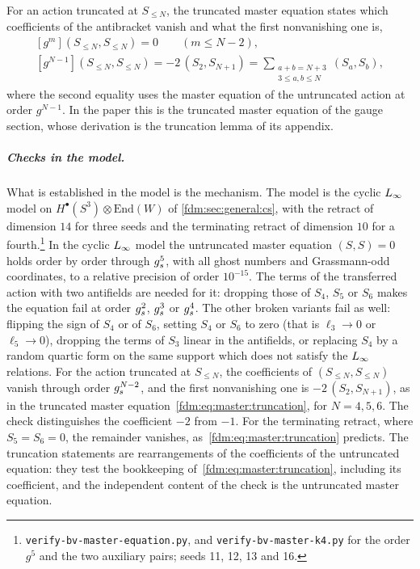 For an action truncated at $S_{\le N}$, the truncated master equation states which coefficients of the antibracket vanish and what the first nonvanishing one is,
\begin{subequations}
  \label{fdm:eq:master:truncation}
  \begin{gather}
    [g^m] (S_{\le N}, S_{\le N})
      = 0
    \qquad
    (m \le N - 2),
    \\
    [g^{N - 1}] (S_{\le N}, S_{\le N})
      = - 2 \, (S_2, S_{N + 1})
      = \sum_{\substack{a + b = N + 3 \\ 3 \le a, b \le N}} (S_a, S_b),
  \end{gather}
\end{subequations}
where the second equality uses the master equation of the untruncated action at order $g^{N - 1}$.
In the paper this is the truncated master equation of the gauge section, whose derivation is the truncation lemma of its appendix.

\subparagraph{Checks in the model.}
What is established in the model is the mechanism.
The model is the cyclic $L_\infty$ model on $H^\bullet(S^3) \otimes \mathrm{End}(W)$ of \cref{fdm:sec:general:cs}, with the retract of dimension $14$ for three seeds and the terminating retract of dimension $10$ for a fourth.\footnote{\texttt{verify-bv-master-equation.py}, and \texttt{verify-bv-master-k4.py} for the order $g^5$ and the two auxiliary pairs; seeds 11, 12, 13 and 16.}
In the cyclic $L_\infty$ model the untruncated master equation $(S, S) = 0$ holds order by order through $g_s^5$, with all ghost numbers and Grassmann-odd coordinates, to a relative precision of order $10^{-15}$.
The terms of the transferred action with two antifields are needed for it: dropping those of $S_4$, $S_5$ or $S_6$ makes the equation fail at order $g_s^2$, $g_s^3$ or $g_s^4$.
The other broken variants fail as well: flipping the sign of $S_4$ or of $S_6$, setting $S_4$ or $S_6$ to zero (that is $\ell_3 \to 0$ or $\ell_5 \to 0$), dropping the terms of $S_3$ linear in the antifields, or replacing $S_4$ by a random quartic form on the same support which does not satisfy the $L_\infty$ relations.
For the action truncated at $S_{\le N}$, the coefficients of $(S_{\le N}, S_{\le N})$ vanish through order $g_s^{N-2}$, and the first nonvanishing one is $- 2 \, (S_2, S_{N+1})$, as in the truncated master equation~\eqref{fdm:eq:master:truncation}, for $N = 4, 5, 6$.
The check distinguishes the coefficient $-2$ from $-1$.
For the terminating retract, where $S_5 = S_6 = 0$, the remainder vanishes, as~\eqref{fdm:eq:master:truncation} predicts.
The truncation statements are rearrangements of the coefficients of the untruncated equation: they test the bookkeeping of~\eqref{fdm:eq:master:truncation}, including its coefficient, and the independent content of the check is the untruncated master equation.


